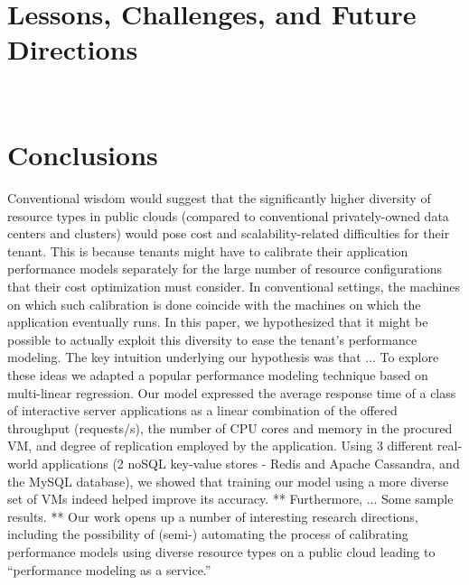
\section{Lessons, Challenges, and Future Directions}
\label{sec:future}
\vspace{10pt}


~

\section{Conclusions}
\label{sec:conclus}
\vspace{10pt}

Conventional wisdom would suggest that the significantly higher diversity of resource types in public clouds (compared to conventional privately-owned data centers and clusters) would pose cost and scalability-related difficulties for their tenant. This is because tenants might have to calibrate their application performance models separately for the large number of resource configurations that their cost optimization must consider. In conventional settings, the machines on which such calibration is done coincide with the machines on which the application eventually runs. In this paper, we hypothesized that it might be possible to actually exploit this diversity to ease the tenant's performance modeling. The key intuition underlying our hypothesis was that ...  To explore these ideas we adapted a popular performance modeling technique based on multi-linear regression. Our model expressed the average response time of a class of interactive server applications as a linear combination of the offered throughput (requests/s), the number of CPU cores and memory in the procured VM, and degree of replication employed by the application. Using 3 different real-world applications (2 noSQL key-value stores - Redis and Apache Cassandra, and the MySQL database), we showed that training our model using a more diverse set of VMs indeed helped improve its accuracy. ** Furthermore, ... Some sample results. **  Our work opens up a number of interesting research directions, including the possibility of (semi-) automating the process of calibrating performance models using diverse resource types on a public cloud leading to ``performance modeling as a service.''


